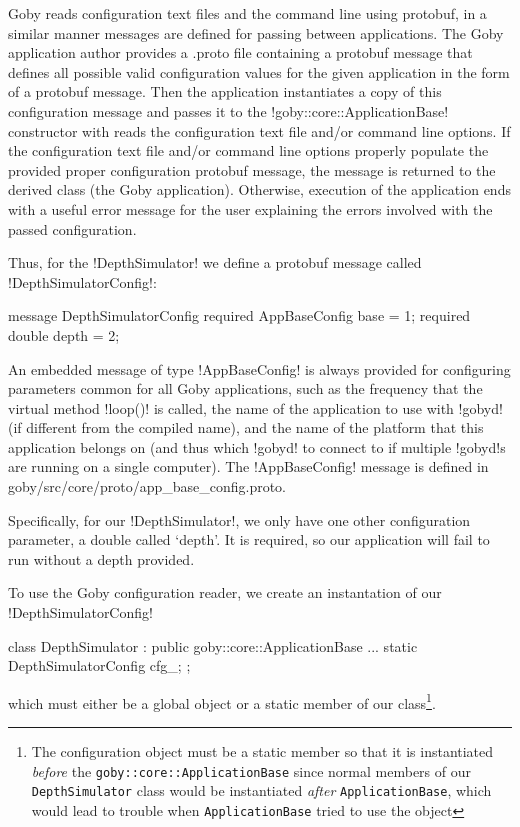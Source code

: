 Goby reads configuration text files and the command line using \gls{protobuf}, in a similar manner messages are defined for passing between applications. The Goby application author provides a .proto file containing a protobuf message that defines all possible valid configuration values for the given application in the form of a protobuf message. Then the application instantiates a copy of this configuration message and passes it to the !goby::core::ApplicationBase! constructor with reads the configuration text file and/or command line options. If the configuration text file and/or command line options properly populate the provided proper configuration protobuf message, the message is returned to the derived class (the Goby application). Otherwise, execution of the application ends with a useful error message for the user explaining the errors involved with the passed configuration. 

Thus, for the !DepthSimulator! we define a protobuf message called !DepthSimulatorConfig!:
\begin{boxedverbatim}
message DepthSimulatorConfig
{
  required AppBaseConfig base = 1;
  required double depth = 2;
}
\end{boxedverbatim}
\resetbvlinenumber

An embedded message of type !AppBaseConfig! is always provided for configuring parameters common for all Goby applications, such as the frequency that the virtual method !loop()! is called, the name of the application to use with !gobyd! (if different from the compiled name), and the name of the platform that this application belongs on (and thus which !gobyd! to connect to if multiple !gobyd!s are running on a single computer). The !AppBaseConfig! message is defined in goby/src/core/proto/app\_base\_config.proto.

Specifically, for our !DepthSimulator!, we only have one other configuration parameter, a double called `depth'. It is required, so our application will fail to run without a depth provided.

To use the Goby configuration reader, we create an instantation of our !DepthSimulatorConfig!
\begin{boxedverbatim}
class DepthSimulator : public goby::core::ApplicationBase
{ 
...
    static DepthSimulatorConfig cfg_;
};
\end{boxedverbatim}
\resetbvlinenumber
which must either be a global object or a static member of our class\footnote{The configuration object must be a static member so that it is instantiated \textit{before} the \texttt{goby::core::ApplicationBase} since normal members of our \texttt{DepthSimulator} class would be instantiated \textit{after} \texttt{ApplicationBase}, which would lead to trouble when \texttt{ApplicationBase} tried to use the object}.

